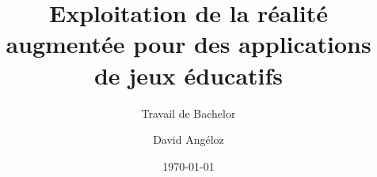 \author{David Angéloz}

\setmale

\title{ Exploitation de la réalité augmentée pour des applications de jeux éducatifs }

\subtitle{Travail de Bachelor}


\date{\today}

